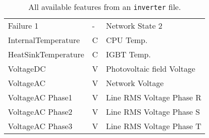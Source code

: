 \begin{table}[H]
\begin{center}
\begin{tabular}[c]{l|l|l}
			Failure 1                                 & -   & Network State  2                   \\
			InternalTemperature                       & C   & CPU Temp.                      \\
			HeatSinkTemperature                       & C   & IGBT Temp.                     \\
			VoltageDC                                 & V   & Photovoltaic field Voltage\\
			VoltageAC                                 & V   & Network Voltage               \\
			VoltageAC Phase1                          & V   & Line RMS Voltage Phase R   \\
			VoltageAC Phase2                          & V   & Line RMS Voltage Phase S   \\
			VoltageAC Phase3                          & V   & Line RMS Voltage Phase T   \\
			\hline
		\end{tabular}
		\caption{All available features from an \texttt{inverter} file.}\label{tab:invfeatures}
	\end{center}
\end{table}


%


